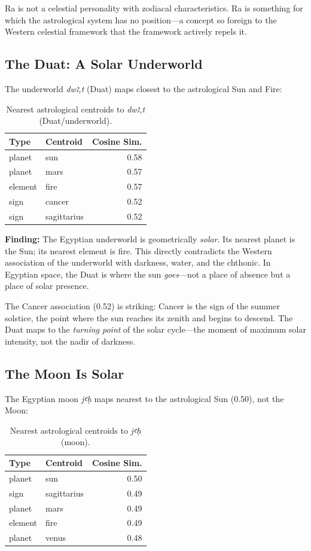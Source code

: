 \documentclass[11pt, a4paper]{article}
\begin{document}
Ra is not a celestial personality with zodiacal characteristics. Ra is something for which the astrological system has no position---a concept so foreign to the Western celestial framework that the framework actively repels it.

\subsection{The Duat: A Solar Underworld}

The underworld \textit{dwꜣ,t} (Duat) maps closest to the astrological Sun and Fire:

\begin{table}[H]
\centering
\begin{tabular}{llr}
\toprule
\textbf{Type} & \textbf{Centroid} & \textbf{Cosine Sim.} \\
\midrule
planet & sun & 0.58 \\
planet & mars & 0.57 \\
element & fire & 0.57 \\
sign & cancer & 0.52 \\
sign & sagittarius & 0.52 \\
\bottomrule
\end{tabular}
\caption{Nearest astrological centroids to \textit{dwꜣ,t} (Duat/underworld).}
\end{table}

{\color{insight}\textbf{Finding:}} The Egyptian underworld is geometrically \textit{solar}. Its nearest planet is the Sun; its nearest element is fire. This directly contradicts the Western association of the underworld with darkness, water, and the chthonic. In Egyptian space, the Duat is where the sun \textit{goes}---not a place of absence but a place of solar presence.

The Cancer association (0.52) is striking: Cancer is the sign of the summer solstice, the point where the sun reaches its zenith and begins to descend. The Duat maps to the \textit{turning point} of the solar cycle---the moment of maximum solar intensity, not the nadir of darkness.

\subsection{The Moon Is Solar}

The Egyptian moon \textit{jꜥḥ} maps nearest to the astrological Sun (0.50), not the Moon:

\begin{table}[H]
\centering
\begin{tabular}{llr}
\toprule
\textbf{Type} & \textbf{Centroid} & \textbf{Cosine Sim.} \\
\midrule
planet & sun & 0.50 \\
sign & sagittarius & 0.49 \\
planet & mars & 0.49 \\
element & fire & 0.49 \\
planet & venus & 0.48 \\
\bottomrule
\end{tabular}
\caption{Nearest astrological centroids to \textit{jꜥḥ} (moon).}
\end{table}
\end{document}

